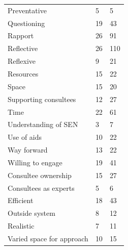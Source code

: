 \documentclass[
  english,
  man,floatsintext]{apa6}
\begin{document}
\begin{longtable}[]{@{}lll@{}}
Preventative & 5 & 5 \\
Questioning & 19 & 43 \\
Rapport & 26 & 91 \\
Reflective & 26 & 110 \\
Reflexive & 9 & 21 \\
Resources & 15 & 22 \\
Space & 15 & 20 \\
Supporting consultees & 12 & 27 \\
Time & 22 & 61 \\
Understanding of SEN & 3 & 7 \\
Use of aids & 10 & 22 \\
Way forward & 13 & 22 \\
Willing to engage & 19 & 41 \\
Consultee ownership & 15 & 27 \\
Consultees as experts & 5 & 6 \\
Efficient & 18 & 43 \\
Outside system & 8 & 12 \\
Realistic & 7 & 11 \\
Varied space for approach & 10 & 15 \\
\bottomrule
\end{longtable}

\newpage
\end{document}
